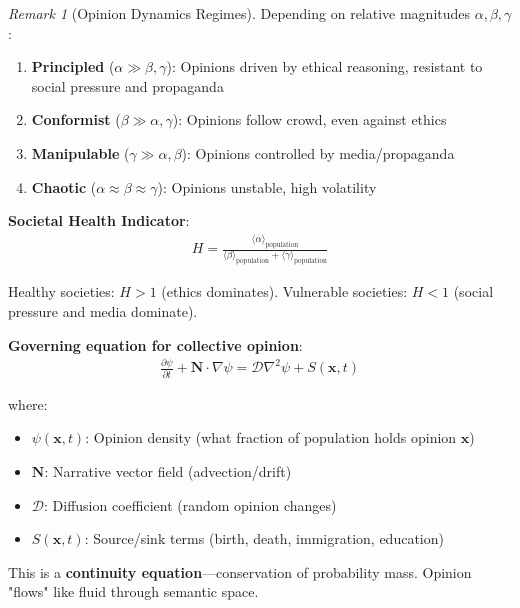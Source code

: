 \documentclass[11pt,a4paper]{article}
\theoremstyle{definition}
\theoremstyle{remark}
\newtheorem{remark}{Remark}[section]
\begin{document}
\begin{enumerate}
\begin{remark}[Opinion Dynamics Regimes]
Depending on relative magnitudes \(\alpha, \beta, \gamma\):

\begin{enumerate}
    \item \textbf{Principled} (\(\alpha \gg \beta, \gamma\)): Opinions driven by ethical reasoning, resistant to social pressure and propaganda
    \item \textbf{Conformist} (\(\beta \gg \alpha, \gamma\)): Opinions follow crowd, even against ethics
    \item \textbf{Manipulable} (\(\gamma \gg \alpha, \beta\)): Opinions controlled by media/propaganda
    \item \textbf{Chaotic} (\(\alpha \approx \beta \approx \gamma\)): Opinions unstable, high volatility
\end{enumerate}

\textbf{Societal Health Indicator}:
\begin{align}
H = \frac{\langle \alpha \rangle_{\text{population}}}{\langle \beta \rangle_{\text{population}} + \langle \gamma \rangle_{\text{population}}}
\end{align}

Healthy societies: \(H > 1\) (ethics dominates). Vulnerable societies: \(H < 1\) (social pressure and media dominate).
\end{remark}

\textbf{Governing equation for collective opinion}:
\begin{align}
\frac{\partial \psi}{\partial t} + \mathbf{N} \cdot \nabla \psi = \mathcal{D} \nabla^2 \psi + S(\mathbf{x}, t)
\end{align}

where:
\begin{itemize}
    \item \(\psi(\mathbf{x}, t)\): Opinion density (what fraction of population holds opinion \(\mathbf{x}\))
    \item \(\mathbf{N}\): Narrative vector field (advection/drift)
    \item \(\mathcal{D}\): Diffusion coefficient (random opinion changes)
    \item \(S(\mathbf{x}, t)\): Source/sink terms (birth, death, immigration, education)
\end{itemize}

This is a \textbf{continuity equation}—conservation of probability mass. Opinion "flows" like fluid through semantic space.


\end{enumerate}
\end{document}
